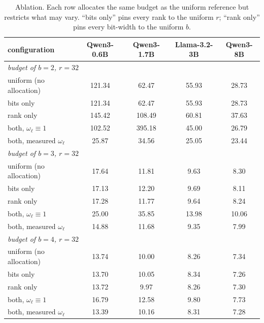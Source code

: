 \begin{table}[H]
\centering
\small
\setlength{\tabcolsep}{4pt}
\caption{Ablation. Each row allocates the same budget as the uniform reference but restricts what may vary. ``bits only'' pins every rank to the uniform $r$; ``rank only'' pins every bit-width to the uniform $b$.}
\label{tab:ablation}
\begin{tabular}{lcccc}
\toprule
configuration & Qwen3-0.6B & Qwen3-1.7B & Llama-3.2-3B & Qwen3-8B \\
\midrule
\multicolumn{5}{l}{\emph{budget of $b=2$, $r=32$}} \\
\quad uniform (no allocation) & 121.34 & 62.47 & 55.93 & 28.73 \\
\quad bits only & 121.34 & 62.47 & 55.93 & 28.73 \\
\quad rank only & 145.42 & 108.49 & 60.81 & 37.63 \\
\quad both, $\omega_\ell \equiv 1$ & 102.52 & 395.18 & 45.00 & 26.79 \\
\quad both, measured $\omega_\ell$ & 25.87 & 34.56 & 25.05 & 23.44 \\
\midrule
\multicolumn{5}{l}{\emph{budget of $b=3$, $r=32$}} \\
\quad uniform (no allocation) & 17.64 & 11.81 & 9.63 & 8.30 \\
\quad bits only & 17.13 & 12.20 & 9.69 & 8.11 \\
\quad rank only & 17.28 & 11.77 & 9.64 & 8.24 \\
\quad both, $\omega_\ell \equiv 1$ & 25.00 & 35.85 & 13.98 & 10.06 \\
\quad both, measured $\omega_\ell$ & 14.88 & 11.68 & 9.35 & 7.99 \\
\midrule
\multicolumn{5}{l}{\emph{budget of $b=4$, $r=32$}} \\
\quad uniform (no allocation) & 13.74 & 10.00 & 8.26 & 7.34 \\
\quad bits only & 13.70 & 10.05 & 8.34 & 7.26 \\
\quad rank only & 13.72 & 9.97 & 8.26 & 7.30 \\
\quad both, $\omega_\ell \equiv 1$ & 16.79 & 12.58 & 9.80 & 7.73 \\
\quad both, measured $\omega_\ell$ & 13.39 & 10.16 & 8.31 & 7.28 \\
\bottomrule
\end{tabular}
\end{table}
